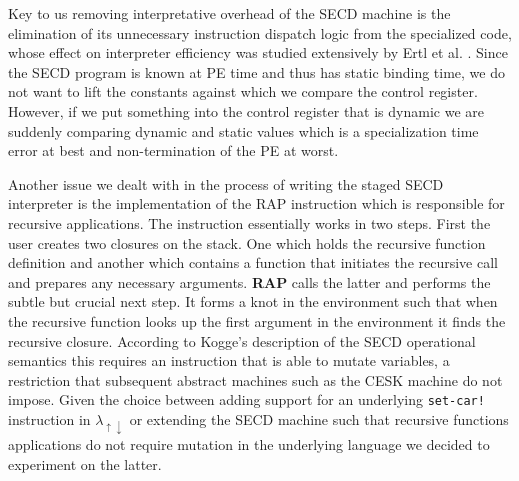 \documentclass[a4paper,12pt,twoside,openright]{report}
\theoremstyle{definition}
\newcommand{\mslang}{$\lambda_{\uparrow\downarrow}$}
\begin{document}
Key to us removing interpretative overhead of the SECD machine is the elimination of its unnecessary instruction dispatch logic from the specialized code, whose effect on interpreter efficiency was studied extensively by Ertl et al. \cite{ertl2003structure}. Since the SECD program is known at PE time and thus has static binding time, we do not want to lift the constants against which we compare the control register. However, if we put something into the control register that is dynamic we are suddenly comparing dynamic and static values which is a specialization time error at best and non-termination of the PE at worst.

Another issue we dealt with in the process of writing the staged SECD interpreter is the implementation of the RAP instruction which is responsible for recursive applications. The instruction essentially works in two steps. First the user creates two closures on the stack. One which holds the recursive function definition and another which contains a function that initiates the recursive call and prepares any necessary arguments. \textbf{RAP} calls the latter and performs the subtle but crucial next step. It forms a knot in the environment such that when the recursive function looks up the first argument in the environment it finds the recursive closure. According to Kogge's \cite{kogge1990architecture} description of the SECD operational semantics this requires an instruction that is able to mutate variables, a restriction that subsequent abstract machines such as the CESK machine \cite{felleisen1987calculi} do not impose. Given the choice between adding support for an underlying \texttt{set-car!} instruction in \mslang{} or extending the SECD machine such that recursive functions applications do not require mutation in the underlying language we decided to experiment on the latter.


\end{document}
